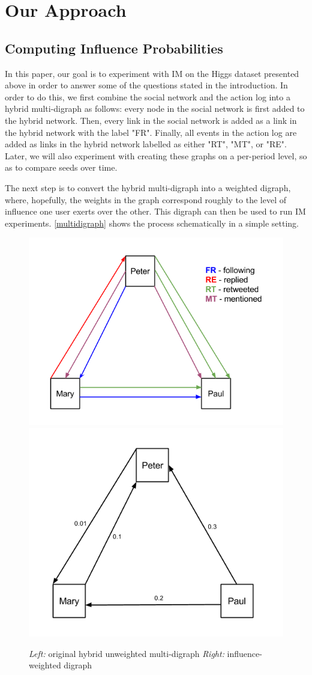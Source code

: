 \documentclass[sigconf]{acmart}
\begin{document}
\section{Our Approach}

\subsection{Computing Influence Probabilities}

In this paper, our goal is to experiment with IM on the Higgs dataset presented above in order to answer some of the questions stated in the introduction. In order to do this, we first combine the social network and the action log into a hybrid multi-digraph as follows: every node in the social network is first added to the hybrid network. Then, every link in the social network is added as a link in the hybrid network with the label "FR". Finally, all events in the action log are added as links in the hybrid network labelled as either "RT", "MT", or "RE". Later, we will also experiment with creating these graphs on a per-period level, so as to compare seeds over time.

The next step is to convert the hybrid multi-digraph into a weighted digraph, where, hopefully, the weights in the graph correspond roughly to the level of influence one user exerts over the other. This digraph can then be used to run IM experiments. \autoref{multidigraph} shows the process schematically in a simple setting. 

\begin{figure}[htbp]
\begin{center}
\includegraphics[width=.5\linewidth]{Figures/MultiDiGraph.png}
\includegraphics[width=.45\linewidth]{Figures/MultiDiGraphII.png}
\caption{\emph{Left:} original hybrid unweighted multi-digraph
\emph{Right: } influence-weighted digraph}
\label{multidigraph}
\end{center}
\end{figure}
\end{document}
